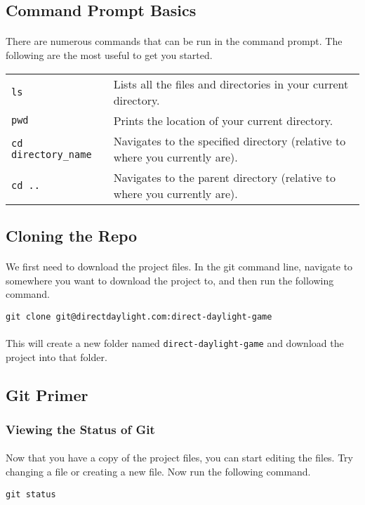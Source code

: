 \documentclass[11pt]{article}
\begin{document}
\subsection{Command Prompt Basics}
\paragraph{}
There are numerous commands that can be run in the command prompt. The following are the most useful to get you started.
\begin{center}
\begin{tabular}{ll}
\lstinline!ls! & Lists all the files and directories in your current directory.\\ 
\lstinline!pwd! & Prints the location of your current directory.\\
\lstinline!cd directory_name! & Navigates to the specified directory (relative to where you currently are).\\
\lstinline!cd .. ! & Navigates to the parent directory (relative to where you currently are).\\
\end{tabular} 
\end{center}
\subsection{Cloning the Repo}
\paragraph{}
We first need to download the project files. In the git command line, navigate to somewhere you want to download the project to, and then run the following command.
\begin{lstlisting}
git clone git@directdaylight.com:direct-daylight-game
\end{lstlisting}
\paragraph{}
This will create a new folder named \lstinline{direct-daylight-game} and download the project into that folder.
\subsection{Git Primer}
\subsubsection{Viewing the Status of Git}
\paragraph{}
Now that you have a copy of the project files, you can start editing the files. Try changing a file or creating a new file. Now run the following command.
\begin{lstlisting}
git status
\end{lstlisting}
\end{document}
